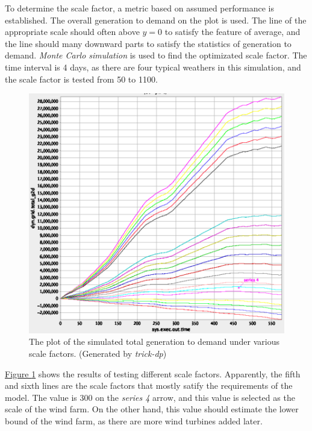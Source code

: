\documentclass[12pt,a4paper]{report}
\begin{document}
            To determine the scale factor, a metric based on assumed performance is established. The overall generation to demand on the plot is used. The line of the appropriate scale should often above $ y = 0$ to satisfy the feature of average, and the line should many downward parts to satisfy the statistics of generation to demand. \emph{Monte Carlo simulation} is used to find the optimizated scale factor. The time interval is 4 days, as there are four typical weathers in this simulation, and the scale factor is tested from 50 to 1100.

            \begin{figure}[ht]
                \centerline{\includegraphics[scale=1.7]{scale_factor}}
                \caption{The plot of the simulated total generation to demand under various scale factors. (Generated by \emph{trick-dp})}
                \label{fig_scale_factor_monte}
            \end{figure}

            \hyperref[fig_scale_factor_monte]{Figure \ref*{fig_scale_factor_monte}} shows the results of testing different scale factors. Apparently, the fifth and sixth lines are the scale factors that mostly satify the requirements of the model. The value is 300 on the \emph{series 4} arrow, and this value is selected as the scale of the wind farm. On the other hand, this value should estimate the lower bound of the wind farm, as there are more wind turbines added later.
\end{document}
